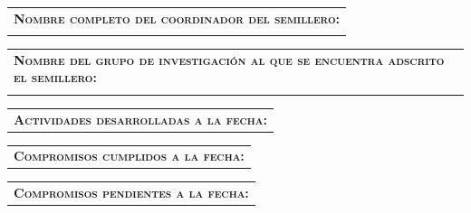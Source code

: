 \documentclass[12pt]{report}
\newcommand\wcolorC{mycolorC}
\begin{document}
{\noindent
\begin{minipage}{\textwidth}
	\begin{tabular}{l}
		\begin{minipage}[t]{\textwidth}%
			\cellcolor{\wcolorC}\textsc{\textbf{Nombre completo del coordinador del semillero:}}
		\end{minipage}
		\vspace{0.1cm}\\
		\begin{minipage}[t]{\textwidth}%
			{\leader}
		\end{minipage}
	\end{tabular}	
\end{minipage}
\noindent
\begin{minipage}{\textwidth}
	\begin{tabular}{l}
		\begin{minipage}[t]{\textwidth}%
			\cellcolor{\wcolorC}\textsc{\textbf{Nombre del grupo de investigación al que se encuentra adscrito el semillero:}}
		\end{minipage}
		\vspace{0.1cm}\\
		\begin{minipage}[t]{\textwidth}%
			{\resgroup}
		\end{minipage}
	\end{tabular}	
\end{minipage}

\vspace{0.2 cm}
\noindent
\begin{minipage}{\textwidth}
	\begin{tabular}{l}
		\begin{minipage}[t]{\textwidth}%
			\cellcolor{\wcolorC}\textsc{\textbf{Actividades desarrolladas a la fecha:}}
		\end{minipage}
		\vspace{0.1cm}
	\end{tabular}	
\end{minipage}
\indent\devactivities

\vspace{0.3 cm}
\noindent
\begin{minipage}{\textwidth}
	\begin{tabular}{l}
		\begin{minipage}[t]{\textwidth}%
			\cellcolor{\wcolorC}\textsc{\textbf{Compromisos cumplidos a la fecha:}}
		\end{minipage}
		\vspace{0.1cm}
	\end{tabular}	
\end{minipage}
\indent\commitments

\vspace{0.3 cm}
\noindent
\begin{minipage}{\textwidth}
	\begin{tabular}{l}
		\begin{minipage}[t]{\textwidth}%
			\cellcolor{\wcolorC}\textsc{\textbf{Compromisos pendientes a la fecha:}}
		\end{minipage}
		\vspace{0.1cm}
	\end{tabular}	
\end{minipage}
\indent\todo
}
\end{document}
